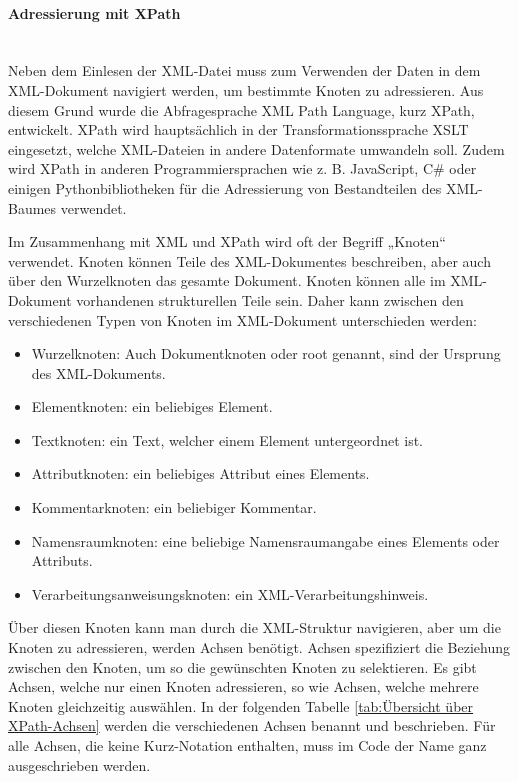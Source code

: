 \paragraph{Adressierung mit XPath}

\\

Neben dem Einlesen der \ac{XML}-Datei muss zum Verwenden der Daten in dem \ac{XML}-Dokument navigiert werden, um bestimmte Knoten zu adressieren.
Aus diesem Grund wurde die Abfragesprache XML Path Language, kurz XPath, entwickelt.
XPath wird hauptsächlich in der Transformationssprache \ac{XSLT} eingesetzt, welche \ac{XML}-Dateien in andere Datenformate umwandeln soll.
Zudem wird XPath in anderen Programmiersprachen wie z. B. JavaScript, C# oder einigen Pythonbibliotheken für die Adressierung von Bestandteilen des \ac{XML}-Baumes verwendet.

Im Zusammenhang mit \ac{XML} und XPath wird oft der Begriff „Knoten“ verwendet.
Knoten können Teile des \ac{XML}-Dokumentes beschreiben, aber auch über den Wurzelknoten das gesamte Dokument.
Knoten können alle im \ac{XML}-Dokument vorhandenen strukturellen Teile sein.
Daher kann zwischen den verschiedenen Typen von Knoten im \ac{XML}-Dokument unterschieden werden:

\begin{itemize}
\item Wurzelknoten: Auch Dokumentknoten oder root genannt, sind der Ursprung des \ac{XML}-Dokuments.
\item Elementknoten: ein beliebiges Element.
\item Textknoten: ein Text, welcher einem Element untergeordnet ist.
\item Attributknoten: ein beliebiges Attribut eines Elements.
\item Kommentarknoten: ein beliebiger Kommentar.
\item Namensraumknoten: eine beliebige Namensraumangabe eines Elements oder Attributs.
\item Verarbeitungsanweisungsknoten: ein XML-Verarbeitungshinweis.
\end{itemize}

Über diesen Knoten kann man durch die \ac{XML}-Struktur navigieren, aber um die Knoten zu adressieren, werden Achsen benötigt.
Achsen spezifiziert die Beziehung zwischen den Knoten, um so die gewünschten Knoten zu selektieren.
Es gibt Achsen, welche nur einen Knoten adressieren, so wie Achsen, welche mehrere Knoten gleichzeitig auswählen.
In der folgenden Tabelle \ref{tab:Übersicht über XPath-Achsen} werden die verschiedenen Achsen benannt und beschrieben.
Für alle Achsen, die keine Kurz-Notation enthalten, muss im Code der Name ganz ausgeschrieben werden. \cite*{XPath2025}

